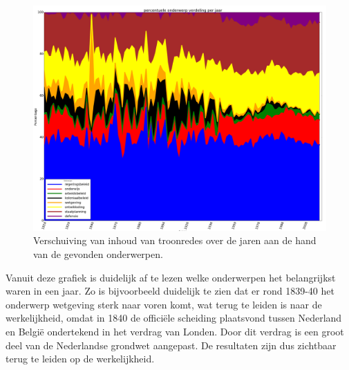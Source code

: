 \begin{figure}[H]
\hfill\includegraphics[width=1.2\textwidth,left]{fig/onderwerpverdeling}
\caption{\label{onderwerpverdeling} Verschuiving van inhoud van troonredes over de jaren aan de hand van de gevonden onderwerpen.}
\end{figure}


Vanuit deze grafiek is duidelijk af te lezen welke onderwerpen het belangrijkst waren in een jaar. Zo is bijvoorbeeld duidelijk te zien dat er rond 1839-40 het onderwerp wetgeving sterk naar voren komt, wat terug te leiden is naar de werkelijkheid, omdat in 1840 de officiële scheiding plaatsvond tussen Nederland en België ondertekend in het verdrag van Londen. Door dit verdrag is een groot deel van de Nederlandse grondwet aangepast. \citep{schroeder1996transformation} De resultaten zijn dus zichtbaar terug te leiden op de werkelijkheid.